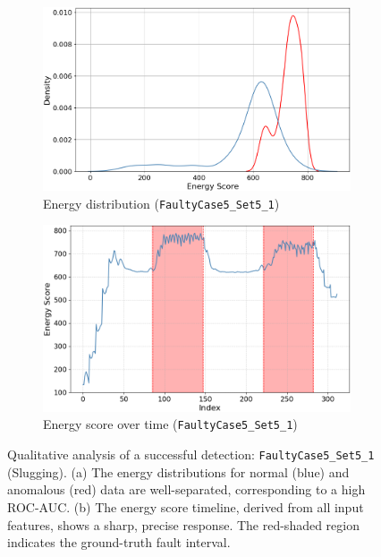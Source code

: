 \documentclass{article}
\begin{document}
\begin{figure}[h!]
    \centering
    \begin{subfigure}[b]{0.49\linewidth}
        \centering
        \includegraphics[width=\linewidth]{figures/scores_threshold_energy_distribution_5_5_1.png}
        \caption{Energy distribution (\texttt{FaultyCase5\_Set5\_1})}\label{fig:dist_5_5_1}
    \end{subfigure}
    \hfill
    \begin{subfigure}[b]{0.49\linewidth}
        \centering
        \includegraphics[width=\linewidth]{figures/scores_threshold_energy_over_time_5_5_1.png}
        \caption{Energy score over time (\texttt{FaultyCase5\_Set5\_1})}\label{fig:time_5_5_1}
    \end{subfigure}
    \caption{Qualitative analysis of a successful detection: \texttt{FaultyCase5\_Set5\_1} (Slugging). (a) The energy distributions for normal (blue) and anomalous (red) data are well-separated, corresponding to a high ROC-AUC. (b) The energy score timeline, derived from all input features, shows a sharp, precise response. The red-shaded region indicates the ground-truth fault interval.}\label{fig:case_5_5_1}
\end{figure}
\end{document}
